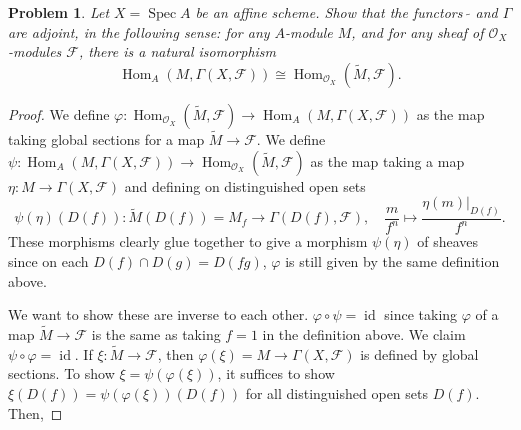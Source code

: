 \documentclass[12pt,letterpaper]{article}
\newtheorem{problem}{Problem}[section]
\theoremstyle{definition}
\theoremstyle{remark}
\numberwithin{equation}{section}
\numberwithin{figure}{problem}
\DeclareMathOperator{\Spec}{Spec}
\DeclareMathOperator{\Hom}{Hom}
\DeclareMathOperator{\id}{id}
\newcommand{\FF}{\mathscr{F}}
\newcommand{\OO}{\mathcal{O}}
\begin{document}
\begin{problem}
  Let $X = \Spec A$ be an affine scheme. Show that the functors $\:\tilde{}$ and $\Gamma$ are adjoint, in the following sense: for any $A$-module $M$, and for any sheaf of $\OO_X$-modules $\FF$, there is a natural isomorphism
  \begin{equation*}
    \Hom_A(M,\Gamma(X,\FF)) \cong \Hom_{\OO_X}(\tilde{M},\FF).
  \end{equation*}
\end{problem}
\begin{proof}
  We define $\varphi\colon \Hom_{\OO_X}(\tilde{M},\FF) \to \Hom_A(M,\Gamma(X,\FF))$ as the map taking global sections for a map $\tilde{M} \to \FF$. We define $\psi\colon \Hom_A(M,\Gamma(X,\FF)) \to \Hom_{\OO_X}(\tilde{M},\FF)$ as the map taking a map $\eta\colon M \to \Gamma(X,\FF)$ and defining on distinguished open sets
  \begin{equation*}
    \psi(\eta)(D(f))\colon \tilde{M}(D(f)) = M_f \to \Gamma(D(f),\FF), \quad \frac{m}{f^n} \mapsto \frac{\eta(m)\vert_{D(f)}}{f^n}.
  \end{equation*}
  These morphisms clearly glue together to give a morphism $\psi(\eta)$ of sheaves since on each $D(f) \cap D(g) = D(fg)$, $\varphi$ is still given by the same definition above.
  \par We want to show these are inverse to each other. $\varphi \circ \psi = \id$ since taking $\varphi$ of a map $\tilde{M} \to \FF$ is the same as taking $f=1$ in the definition above. We claim $\psi \circ \varphi = \id$. If $\xi \colon \tilde{M} \to \FF$, then $\varphi(\xi) = M \to \Gamma(X,\FF)$ is defined by global sections. To show $\xi = \psi(\varphi(\xi))$, it suffices to show $\xi(D(f)) = \psi(\varphi(\xi))(D(f))$ for all distinguished open sets $D(f)$. Then,

\end{proof}
\end{document}
